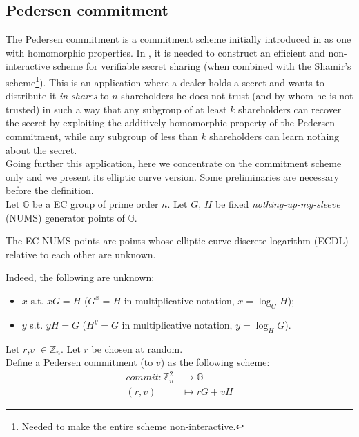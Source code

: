 \subsection{Pedersen commitment}
\label{subsec_PC}
The Pedersen commitment is a commitment scheme initially introduced in \cite{Pedersen} as one with homomorphic properties. In \cite{Pedersen}, it is needed to construct an efficient and non-interactive scheme for verifiable secret sharing (when combined with the Shamir's scheme\footnote{Needed to make the entire scheme non-interactive.}). This is an application where a dealer holds a secret and wants to distribute it \textit{in shares} to $n$ shareholders he does not trust (and by whom he is not trusted) in such a way that any subgroup of at least $k$ shareholders can recover the secret by exploiting the additively homomorphic property of the Pedersen commitment, while any subgroup of less than $k$ shareholders can learn nothing about the secret.\\
Going further this application, here we concentrate on the commitment scheme only and we present its elliptic curve version. Some preliminaries are necessary before the definition.\\
Let $\mathbb{G}$ be a EC group of prime order $n$. Let $G$, $H$ be fixed \textit{nothing-up-my-sleeve} (NUMS) generator points of $\mathbb{G}$.
\begin{mydef}
\label{NUMS}
    The EC NUMS points are points whose elliptic curve discrete logarithm (ECDL) relative to each other are unknown.
\end{mydef}
\begin{myrem}
    Indeed, the following are unknown: \begin{itemize}
        \item $x$ s.t. $xG = H$ ($G^x = H$ in multiplicative notation, $x=\log_GH$);
        \item $y$ s.t. $yH = G$ ($H^y = G$ in multiplicative notation, $y=\log_HG$).
    \end{itemize}
\end{myrem}
\begin{mydef}
\label{Pedersen_commitment}
    Let $r$,$v$ $\in \mathbb{Z}_n$. Let $r$ be chosen at random.\\ Define a Pedersen commitment (to $v$) as the following scheme: \begin{align*}
        commit \colon \mathbb{Z}_n^2 &\to \mathbb{G}\\
        (r,v) &\mapsto rG + vH
        \end{align*}
\end{mydef}
